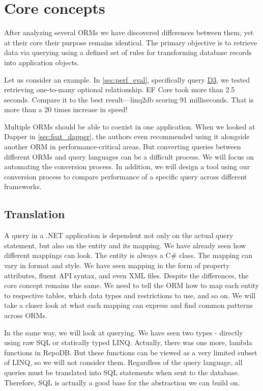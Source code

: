 \chapter{Core concepts}


After analyzing several ORMs we have discovered differences between them, yet at their core their purpose remains identical. The primary objective is to retrieve data via querying using a defined set of rules for transforming database records into application objects.

Let us consider an example. In \autoref{sec:perf_eval}, specifically query \hyperref[query:d3]{D3}, we tested retrieving one-to-many optional relationship.
EF Core took more than 2.5 seconds. Compare it to the best result---linq2db scoring 91 milliseconds. That is more than a 20 times increase in speed! 

Multiple ORMs should be able to coexist in one application. When we looked at Dapper in \autoref{sec:feat_dapper}, the authors even recommended using it alongside another ORM in performance-critical areas. But converting queries between different ORMs and query languages can be a difficult process. We will focus on automating the conversion process. In addition, we will design a tool using our conversion process to compare performance of a specific query across different frameworks.

\section{Translation}

A query in a .NET application is dependent not only on the actual query statement, but also on the entity and its mapping. We have already seen how different mappings can look. The entity is always a C\# class. The mapping can vary in format and style. We have seen mapping in the form of property attributes, fluent API syntax, and even XML files. Despite the differences, the core concept remains the same. We need to tell the ORM how to map each entity to respective tables, which data types and restrictions to use, and so on. We will take a closer look at what each mapping can express and find common patterns across ORMs. 

In the same way, we will look at querying. We have seen two types - directly using raw SQL or statically typed LINQ. Actually, there was one more, lambda functions in RepoDB. But these functions can be viewed as a very limited subset of LINQ, so we will not consider them. Regardless of the query language, all queries must be translated into SQL statements when sent to the database. Therefore, SQL is actually a good base for the abstraction we can build on.

